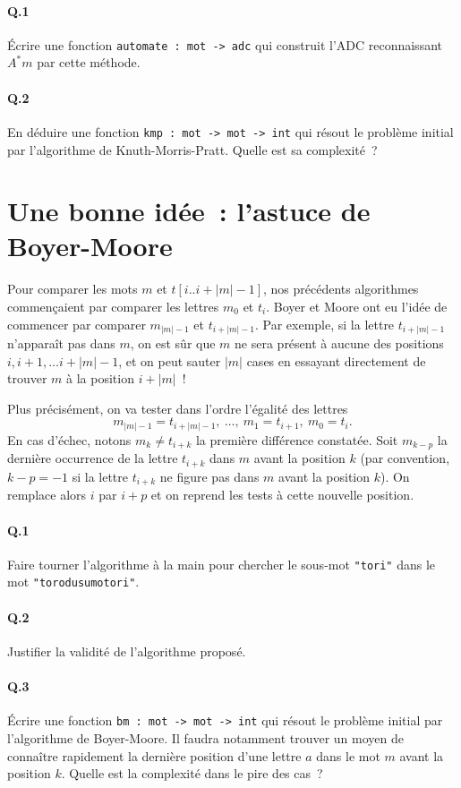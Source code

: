 \documentclass[10pt,a4paper]{article}
\begin{document}
\paragraph{Q.1} Écrire une fonction \texttt{automate : mot -> adc} qui construit 
l'ADC reconnaissant $A^* m$ par cette méthode.
\paragraph{Q.2} En déduire une fonction \texttt{kmp : mot -> mot -> int} qui 
résout le problème initial par l'algorithme de Knuth-Morris-Pratt. Quelle est 
sa complexité~?

\section{Une bonne idée~: l'astuce de Boyer-Moore} 
Pour comparer les mots $m$ et $t[i..i+|m|-1]$, nos précédents 
algorithmes commençaient par comparer les lettres $m_0$ et $t_i$. Boyer et 
Moore ont eu l'idée de commencer par comparer $m_{|m|-1}$ et $t_{i+|m|-1}$. Par 
exemple, si la lettre $t_{i+|m|-1}$ n'apparaît pas dans $m$, on est sûr que $m$ 
ne sera présent à aucune des positions $i, i+1, \dots i+|m|-1$, et on peut sauter
$|m|$ cases en essayant directement de trouver $m$ à la position $i+|m|$~!

Plus précisément, on va tester dans l'ordre l'égalité des lettres
\[m_{|m|-1} = t_{i+|m|-1}, \ \dots, \ m_1 = t_{i+1}, \ m_0 = t_i.\]
En cas d'échec, notons $m_k \neq t_{i+k}$ la première différence constatée. Soit 
$m_{k-p}$ la dernière occurrence de la lettre $t_{i+k}$ dans $m$ avant la 
position $k$ (par convention, $k-p=-1$ si la lettre $t_{i+k}$ ne figure pas dans
$m$ avant la position $k$). On remplace alors $i$ par $i+p$ et on reprend les 
tests à cette nouvelle position.
\paragraph{Q.1} Faire tourner l'algorithme à la main pour chercher le sous-mot 
\texttt{"tori"} dans le mot \texttt{"torodusumotori"}.
\paragraph{Q.2} Justifier la validité de l'algorithme proposé.
\paragraph{Q.3} Écrire une fonction \texttt{bm : mot -> mot -> int} qui résout
le problème initial par l'algorithme de Boyer-Moore. Il faudra notamment trouver 
un moyen de connaître rapidement la dernière position d'une lettre $a$ dans le 
mot $m$ avant la position $k$. Quelle est la complexité dans le pire des cas~?
\end{document}
